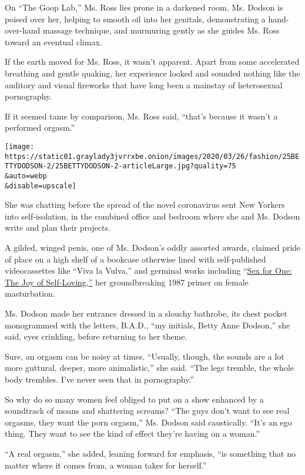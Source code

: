 On ``The Goop Lab,'' Ms. Ross lies prone in a darkened room. Ms. Dodson
is poised over her, helping to smooth oil into her genitals,
demonstrating a hand-over-hand massage technique, and murmuring gently
as she guides Ms. Ross toward an eventual climax.

If the earth moved for Ms. Ross, it wasn't apparent. Apart from some
accelerated breathing and gentle quaking, her experience looked and
sounded nothing like the auditory and visual fireworks that have long
been a mainstay of heterosexual pornography.

If it seemed tame by comparison, Ms. Ross said, ``that's because it
wasn't a performed orgasm.''

\texttt{[image: https://static01.graylady3jvrrxbe.onion/images/2020/03/26/fashion/25BETTYDODSON-2/25BETTYDODSON-2-articleLarge.jpg?quality=75\\\&auto=webp\\\&disable=upscale]}

She was chatting before the spread of the novel coronavirus sent New
Yorkers into self-isolation, in the combined office and bedroom where
she and Ms. Dodson write and plan their projects.

A gilded, winged penis, one of Ms. Dodson's oddly assorted awards,
claimed pride of place on a high shelf of a bookcase otherwise lined
with self-published videocassettes like ``Viva la Vulva,'' and germinal
works including
``\href{https://www.penguinrandomhouse.com/books/41589/sex-fo}{Sex for
One: The Joy of Self-Loving,''} her groundbreaking 1987 primer on female
masturbation.

Ms. Dodson made her entrance dressed in a slouchy bathrobe, its chest
pocket monogrammed with the letters, B.A.D., ``my initials, Betty Anne
Dodson,'' she said, eyes crinkling, before returning to her theme.

Sure, an orgasm can be noisy at times. ``Usually, though, the sounds are
a lot more guttural, deeper, more animalistic,'' she said. ``The legs
tremble, the whole body trembles. I've never seen that in pornography.''

So why do so many women feel obliged to put on a show enhanced by a
soundtrack of moans and shattering screams? ``The guys don't want to see
real orgasms, they want the porn orgasm,'' Ms. Dodson said caustically.
``It's an ego thing. They want to see the kind of effect they're having
on a woman.''

``A real orgasm,'' she added, leaning forward for emphasis, ``is
something that no matter where it comes from, a woman takes for
herself.''

